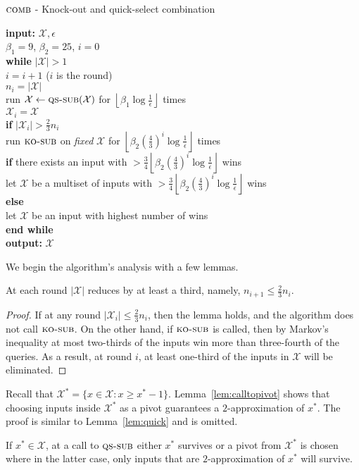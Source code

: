 \documentclass[twoside,11pt]{article}
\newcommand{\cX}{\mathcal{X}}
\newcommand{\algorithms}[1]{\textsc{#1}}
\newcommand{\algkosub}{\algorithms{ko-sub}}
\newcommand{\algqssub}{\algorithms{qs-sub}}
\newcommand{\algcomb}{\algorithms{comb}}
\newcommand{\maxx}{x^*}
\newcommand{\errorcomb}{\epsilon}
\begin{document}
\begin{algorithm}
\label{alg:qks}
\caption{$\algcomb$ - Knock-out and quick-select combination}
\textbf{input:} $\cX,\errorcomb$\\
\qquad $\beta_1=9$, $\beta_2=25$, $i=0$\\
\qquad \textbf{while} $|\cX|>1$	\\
\qquad\qquad $i=i+1$ \qquad\qquad($i$ is the round)\\
\qquad\qquad $n_i=|\cX|$\\
\qquad\qquad run $\cX\leftarrow \algqssub(\cX)$ for $\left\lfloor\beta_1 \log\tfrac1\errorcomb\right\rfloor$ times\\
\qquad\qquad $\cX_i=\cX$\\
\qquad\qquad \textbf{if} $|\cX_i|>\frac23 n_i$\\
\qquad\qquad\qquad run $\algkosub$ on \emph{fixed} $\cX$ for $\left\lfloor\beta_2 \left(\frac43\right)^i \log\tfrac1\errorcomb\right\rfloor$ times\\
\qquad\qquad\qquad \textbf{if} there exists an input with $>\frac34 \left\lfloor\beta_2 \left(\frac43\right)^i \log\tfrac1\errorcomb\right\rfloor$ wins\\
\qquad\qquad\qquad\qquad let $\cX$ be a multiset of inputs with $>\frac34 \left\lfloor\beta_2 \left(\frac43\right)^i \log\tfrac1\errorcomb\right\rfloor$ wins\\
\qquad\qquad\qquad \textbf{else} \\
\qquad\qquad\qquad\qquad let $\cX$ be an input with highest number of wins\\
\qquad \textbf {end while}\\
\textbf{output:} $\cX$
\end{algorithm}

We begin the algorithm's analysis with a few lemmas. 
\begin{lemma}
\label{lem:size-reduction}
At each round $|\cX|$ reduces by at least a third, namely, $n_{i+1}\le \frac23 n_i$.
\end{lemma}
\begin{proof}
If at any round $|\cX_i|\le \frac{2}{3} n_i$, then the lemma holds, and the algorithm does not call $\algkosub$. On the other hand, if $\algkosub$ is called, then by Markov's inequality at most two-thirds of the inputs win more than three-fourth of the queries. As a result, at round $i$, at least one-third of the inputs in $\cX$ will be eliminated.
\end{proof}
Recall that $\cX^*=\{x\in\cX:x\ge\maxx-1\}$. Lemma~\ref{lem:calltopivot} shows that
choosing inputs inside $\cX^*$ as a pivot guarantees a
$2$-approximation of $\maxx$. The proof is similar to
Lemma~\ref{lem:quick} and is omitted.
\begin{lemma}
\label{lem:calltopivot}
If $\maxx\in \cX$, at a call to $\algqssub$ either $\maxx$ survives or a pivot from $\cX^*$ is chosen where in the latter case, 
only inputs that are $2$-approximation of $\maxx$ will survive.
\end{lemma}
\end{document}
